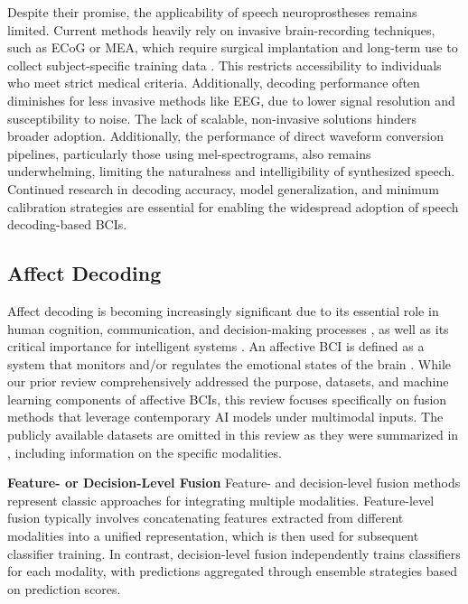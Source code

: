 \documentclass[journal]{IEEEtran}
\begin{document}
Despite their promise, the applicability of speech neuroprostheses remains limited. Current methods heavily rely on invasive brain-recording techniques, such as ECoG or MEA, which require surgical implantation and long-term use to collect subject-specific training data \cite{Vansteensel2024}. This restricts accessibility to individuals who meet strict medical criteria. Additionally, decoding performance often diminishes for less invasive methods like EEG, due to lower signal resolution and susceptibility to noise. The lack of scalable, non-invasive solutions hinders broader adoption. Additionally, the performance of direct waveform conversion pipelines, particularly those using mel-spectrograms, also remains underwhelming, limiting the naturalness and intelligibility of synthesized speech. Continued research in decoding accuracy, model generalization, and minimum calibration strategies are essential for enabling the widespread adoption of speech decoding-based BCIs.

\subsection{Affect Decoding} \label{sect:emotion}

Affect decoding is becoming increasingly significant due to its essential role in human cognition, communication, and decision-making processes \cite{Lerner2015}, as well as its critical importance for intelligent systems \cite{Minsky1988}. An affective BCI is defined as a system that monitors and/or regulates the emotional states of the brain \cite{Wu2023}. While our prior review comprehensively addressed the purpose, datasets, and machine learning components of affective BCIs, this review focuses specifically on fusion methods that leverage contemporary AI models under multimodal inputs. The publicly available datasets are omitted in this review as they were summarized in \cite{Wu2023}, including information on the specific modalities.

\textbf{Feature- or Decision-Level Fusion} Feature- and decision-level fusion methods represent classic approaches for integrating multiple modalities. Feature-level fusion typically involves concatenating features extracted from different modalities into a unified representation, which is then used for subsequent classifier training. In contrast, decision-level fusion independently trains classifiers for each modality, with predictions aggregated through ensemble strategies based on prediction scores.
\end{document}
